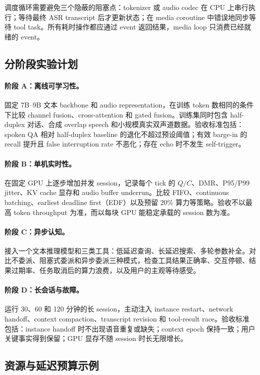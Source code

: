 调度循环需要避免三个隐蔽的阻塞点：tokenizer 或 audio codec 在 CPU 上串行执行；等待最终 ASR transcript 后才更新状态；在 media coroutine 中错误地同步等待 tool task。所有耗时操作都应通过 event 返回结果，media loop 只消费已经就绪的 event。

\subsection{分阶段实验计划}

\paragraph{阶段 A：离线可学习性。}
固定 7B--9B 文本 backbone 和 audio representation，在训练 token 数相同的条件下比较 channel fusion、cross-attention 和 gated fusion。训练集同时包含 half-duplex 对话、合成 overlap speech 和小规模真实双声道数据。验收标准包括：spoken QA 相对 half-duplex baseline 的退化不超过预设阈值；有效 barge-in 的 recall 提升且 false interruption rate 不恶化；存在 echo 时不发生 self-trigger。

\paragraph{阶段 B：单机实时性。}
在固定 GPU 上逐步增加并发 session，记录每个 tick 的 $Q/C$、DMR、P95/P99 jitter、KV cache 显存和 audio buffer underrun。比较 FIFO、continuous batching、earliest deadline first（EDF）以及预留 20\% 算力等策略。验收不以最高 token throughput 为准，而以每块 GPU 能稳定承载的 session 数为准。

\paragraph{阶段 C：异步认知。}
接入一个文本推理模型和三类工具：低延迟查询、长延迟搜索、多轮参数补全。对比不委派、阻塞式委派和异步委派三种模式，检查工具结果正确率、交互停顿、结果过期率、任务取消后的算力浪费，以及用户的主观等待感受。

\paragraph{阶段 D：长会话与故障。}
运行 30、60 和 120 分钟的长 session，主动注入 instance restart、network handoff、context compaction、transcript revision 和 tool-result race。验收标准包括：instance handoff 时不出现语音重复或缺失；context epoch 保持一致；用户关键事实得到保留；GPU 显存不随 session 时长无限增长。

\subsection{资源与延迟预算示例}

